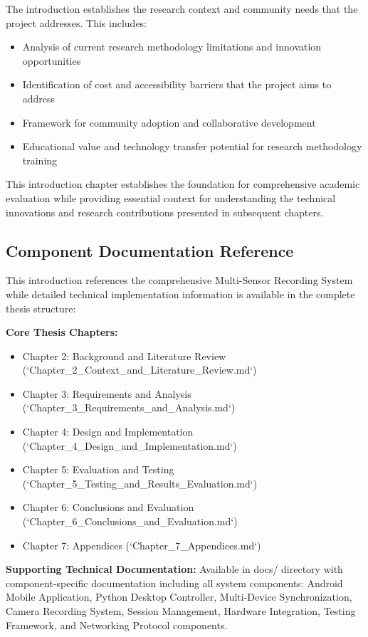 \documentclass[12pt,a4paper]{report}
\begin{document}
The introduction establishes the research context and community needs that the project addresses. This includes:

\begin{itemize}
\item Analysis of current research methodology limitations and innovation opportunities
\item Identification of cost and accessibility barriers that the project aims to address
\item Framework for community adoption and collaborative development
\item Educational value and technology transfer potential for research methodology training

\end{itemize}
This introduction chapter establishes the foundation for comprehensive academic evaluation while providing essential
context for understanding the technical innovations and research contributions presented in subsequent chapters.

\subsection{Component Documentation Reference}

This introduction references the comprehensive Multi-Sensor Recording System while detailed technical implementation
information is available in the complete thesis structure:

\textbf{Core Thesis Chapters:}

\begin{itemize}
\item Chapter 2: Background and Literature Review (`Chapter_2_Context_and_Literature_Review.md`)
\item Chapter 3: Requirements and Analysis (`Chapter_3_Requirements_and_Analysis.md`)
\item Chapter 4: Design and Implementation (`Chapter_4_Design_and_Implementation.md`)
\item Chapter 5: Evaluation and Testing (`Chapter_5_Testing_and_Results_Evaluation.md`)
\item Chapter 6: Conclusions and Evaluation (`Chapter_6_Conclusions_and_Evaluation.md`)
\item Chapter 7: Appendices (`Chapter_7_Appendices.md`)

\end{itemize}
\textbf{Supporting Technical Documentation:}
Available in docs/ directory with component-specific documentation including
all system components: Android Mobile Application, Python Desktop Controller, Multi-Device Synchronization,
Camera Recording System, Session Management, Hardware Integration, Testing Framework, and Networking Protocol
components.
\end{document}
